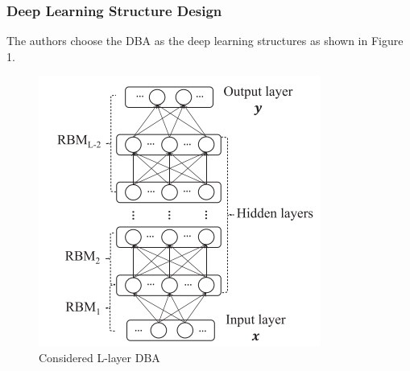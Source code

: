 \documentclass[11pt]{report}
\begin{document}
	\subsubsection{Deep Learning Structure Design}
	The authors choose the DBA as the deep learning structures as shown in Figure 1.
	\begin{figure}[h!]
		\centering
		\includegraphics[width=0.5\linewidth]{figure1.png}
		\caption{Considered L-layer DBA}
		\label{fig-label}
	\end{figure}
	
\end{document}
